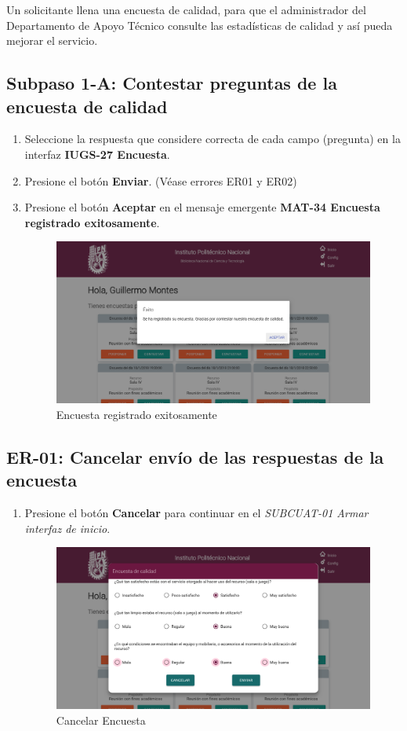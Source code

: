 Un solicitante llena una encuesta de calidad, para que el administrador
	del Departamento de Apoyo Técnico consulte las estadísticas de calidad
	y así pueda mejorar el servicio.
  
  \subsection{Subpaso 1-A: Contestar preguntas de la encuesta de calidad}
\begin{enumerate}
	\item Seleccione la respuesta que considere correcta de cada campo (pregunta)
  en la interfaz \textbf{IUGS-27 Encuesta}.
	\item Presione el botón \textbf{Enviar}. (Véase errores ER01 y ER02)
	\item Presione el botón \textbf{Aceptar} en el mensaje emergente \textbf{MAT-34 Encuesta registrado exitosamente}.
	\begin{figure}[hbtp]
	\includegraphics[scale=0.3]{images/Interfaz/MAT-34 Encuesta registrado exitosamente.png}
	\caption{Encuesta registrado exitosamente}
	\end{figure}
\end{enumerate}

  \subsection{ER-01: Cancelar envío de las respuestas de la encuesta}
\begin{enumerate}
	\item Presione el botón \textbf{Cancelar} para continuar en el
  \textit{SUBCUAT-01 Armar interfaz de inicio}.
  \begin{figure}[hbtp]
	\includegraphics[scale=0.3]{images/Interfaz/Errores Encuesta.png}
	\caption{Cancelar Encuesta}
	\end{figure}
\end{enumerate}

